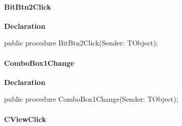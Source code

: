 \documentclass{report}
\newif\ifpdf
\begin{document}
\paragraph*{BitBtn2Click}\hspace*{\fill}

\label{swcatalog.TSCForm-BitBtn2Click}
\begin{list}{}{
\setlength{\itemindent}{0cm}
\setlength{\listparindent}{0cm}
\setlength{\leftmargin}{\evensidemargin}
\addtolength{\leftmargin}{\tmplength}
\settowidth{\labelsep}{X}
\addtolength{\leftmargin}{\labelsep}
\setlength{\labelwidth}{\tmplength}
}
\item[\textbf{Declaration}\hfill]
\ifpdf
\begin{flushleft}
\fi
\begin{ttfamily}
public procedure BitBtn2Click(Sender: TObject);\end{ttfamily}

\ifpdf
\end{flushleft}
\fi

\end{list}
\paragraph*{ComboBox1Change}\hspace*{\fill}

\label{swcatalog.TSCForm-ComboBox1Change}
\begin{list}{}{
\setlength{\itemindent}{0cm}
\setlength{\listparindent}{0cm}
\setlength{\leftmargin}{\evensidemargin}
\addtolength{\leftmargin}{\tmplength}
\settowidth{\labelsep}{X}
\addtolength{\leftmargin}{\labelsep}
\setlength{\labelwidth}{\tmplength}
}
\item[\textbf{Declaration}\hfill]
\ifpdf
\begin{flushleft}
\fi
\begin{ttfamily}
public procedure ComboBox1Change(Sender: TObject);\end{ttfamily}

\ifpdf
\end{flushleft}
\fi

\end{list}
\paragraph*{CViewClick}\hspace*{\fill}
\end{document}
